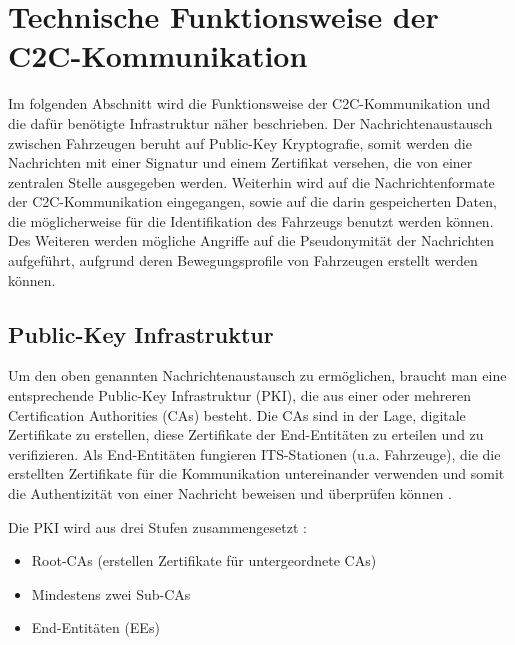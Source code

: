 
\section{Technische  Funktionsweise der C2C-Kommunikation}
\label{ch:FirstContentSection}

Im folgenden Abschnitt wird die Funktionsweise der C2C-Kommunikation und die dafür benötigte Infrastruktur näher beschrieben. Der Nachrichtenaustausch zwischen Fahrzeugen beruht auf Public-Key Kryptografie, somit werden die Nachrichten mit einer Signatur und einem Zertifikat versehen, die von einer zentralen Stelle ausgegeben werden. Weiterhin wird auf die Nachrichtenformate der C2C-Kommunikation eingegangen, sowie auf die darin gespeicherten Daten, die möglicherweise für die Identifikation des Fahrzeugs benutzt werden können. Des Weiteren werden mögliche Angriffe auf die Pseudonymität der Nachrichten aufgeführt, aufgrund deren Bewegungsprofile von Fahrzeugen erstellt werden können.

\subsection{Public-Key Infrastruktur}
\label{sec:FirstContentSection:FirstSubSection}
 
Um den oben genannten Nachrichtenaustausch zu ermöglichen, braucht man eine entsprechende Public-Key Infrastruktur (PKI), die aus einer oder mehreren Certification Authorities (CAs) besteht. Die CAs sind in der Lage, digitale Zertifikate zu erstellen, diese Zertifikate der End-Entitäten zu erteilen und zu verifizieren. Als End-Entitäten fungieren ITS-Stationen (u.a. Fahrzeuge), die die erstellten Zertifikate für die Kommunikation untereinander verwenden und somit die Authentizität von einer Nachricht beweisen und überprüfen können  \cite{Strubbe2017}. 

Die PKI wird aus drei Stufen zusammengesetzt \cite{SecurityCITS}: 
\begin{itemize}
	\item Root-CAs (erstellen Zertifikate für untergeordnete CAs)
	\item Mindestens zwei Sub-CAs
	\item End-Entitäten (EEs)
\end{itemize}

